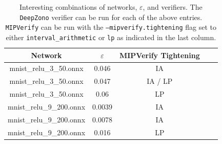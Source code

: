 \documentclass[11pt,fleqn]{article}
\begin{document}
\begin{table}
\centering
\begin{tabular}{|c|c|c|c|c|}
\hline
    Network & $\varepsilon$ & MIPVerify Tightening \\
\hline
    mnist\_relu\_3\_50.onnx & 0.046  & IA  \\  %
    mnist\_relu\_3\_50.onnx & 0.047 & IA / LP  \\  %
    mnist\_relu\_3\_50.onnx & 0.06 & LP \\  %
    mnist\_relu\_9\_200.onnx & 0.0039 & IA \\  %
    mnist\_relu\_9\_200.onnx & 0.0078 & IA \\  %
    mnist\_relu\_9\_200.onnx & 0.016 & LP \\  %
\hline
\end{tabular}
\caption{Interesting combinations of networks, $\varepsilon$, and verifiers.
         The \texttt{DeepZono} verifier can be run for each of the above entries.
         \texttt{MIPVerify} can be run with the \texttt{--mipverify.tightening} flag set to either \texttt{interval\_arithmetic} or \texttt{lp} as 
         indicated in the last column.}
\label{tab:interesting_combinations}
\end{table}
\end{document}
